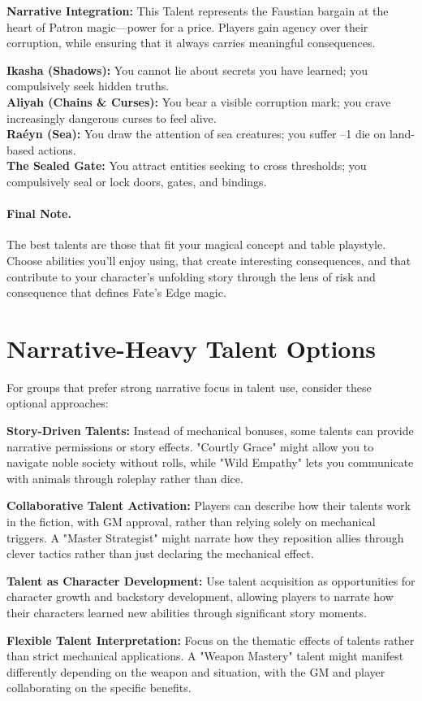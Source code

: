 \textbf{Narrative Integration:} This Talent represents the Faustian bargain at the heart of Patron magic—power for a price. Players gain agency over their corruption, while ensuring that it always carries meaningful consequences.

\begin{tcolorbox}[title=Example Corruptions by Patron]
\textbf{Ikasha (Shadows):} You cannot lie about secrets you have learned; you compulsively seek hidden truths. \\
\textbf{Aliyah (Chains \& Curses):} You bear a visible corruption mark; you crave increasingly dangerous curses to feel alive. \\
\textbf{Raéyn (Sea):} You draw the attention of sea creatures; you suffer --1 die on land-based actions. \\
\textbf{The Sealed Gate:} You attract entities seeking to cross thresholds; you compulsively seal or lock doors, gates, and bindings.
\end{tcolorbox}

\paragraph{Final Note.}
The best talents are those that fit your magical concept and table playstyle. Choose abilities you'll enjoy using, that create interesting consequences, and that contribute to your character's unfolding story through the lens of risk and consequence that defines Fate's Edge magic.

\section{Narrative-Heavy Talent Options}

For groups that prefer strong narrative focus in talent use, consider these optional approaches:

\textbf{Story-Driven Talents:} Instead of mechanical bonuses, some talents can provide narrative permissions or story effects. "Courtly Grace" might allow you to navigate noble society without rolls, while "Wild Empathy" lets you communicate with animals through roleplay rather than dice.

\textbf{Collaborative Talent Activation:} Players can describe how their talents work in the fiction, with GM approval, rather than relying solely on mechanical triggers. A "Master Strategist" might narrate how they reposition allies through clever tactics rather than just declaring the mechanical effect.

\textbf{Talent as Character Development:} Use talent acquisition as opportunities for character growth and backstory development, allowing players to narrate how their characters learned new abilities through significant story moments.

\textbf{Flexible Talent Interpretation:} Focus on the thematic effects of talents rather than strict mechanical applications. A "Weapon Mastery" talent might manifest differently depending on the weapon and situation, with the GM and player collaborating on the specific benefits.
